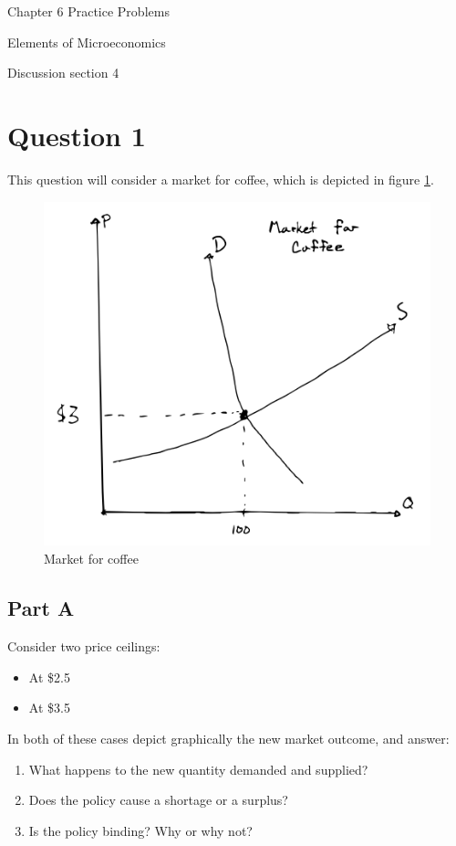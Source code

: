 \documentclass[12pt]{article}
\begin{document}
\begin{center}
\Large Chapter 6 Practice Problems

\medskip

\normalsize Elements of Microeconomics

\medskip

\small Discussion section 4
\end{center}

\medskip

\section*{Question 1}
This question will consider a market for coffee, which is depicted in figure \ref{fig:coffee_eq}.

\begin{figure}[h]
    \centering
    \includegraphics[width=.6\textwidth]{coffee_eq.png}
    \caption{Market for coffee}
    \label{fig:coffee_eq}
\end{figure}

\subsection*{Part A}
Consider two price ceilings:
    \begin{itemize}
        \item At \$2.5
        \item At \$3.5
    \end{itemize}

    \vspace{5mm}

    In both of these cases depict graphically the new market outcome, and answer:
    \begin{enumerate}
        \item What happens to the new quantity demanded and supplied?
        \item Does the policy cause a shortage or a surplus?
        \item Is the policy binding? Why or why not?
    \end{enumerate}
\end{document}
